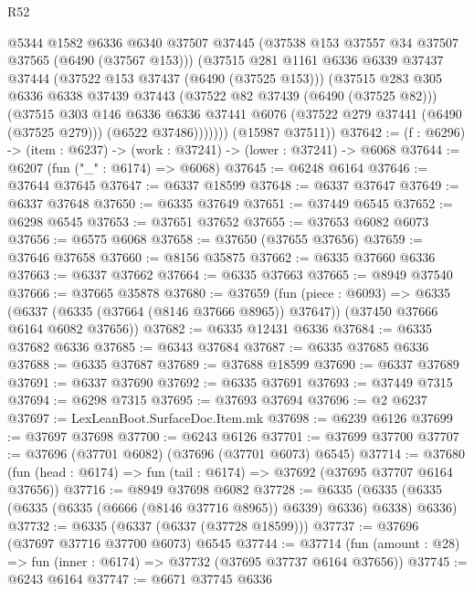 \begin{lexlean}{R52}
\begin{coremodule}
            @5344
            @1582
            @6336
            @6340
            @37507
            @37445
            (@37538 @153 @37557 @34 @37507 @37565 (@6490 (@37567 @153)))
            (@37515
              @281
              @1161
              @6336
              @6339
              @37437
              @37444
              (@37522 @153 @37437 (@6490 (@37525 @153)))
              (@37515
                @283
                @305
                @6336
                @6338
                @37439
                @37443
                (@37522 @82 @37439 (@6490 (@37525 @82)))
                (@37515
                  @303
                  @146
                  @6336
                  @6336
                  @37441
                  @6076
                  (@37522 @279 @37441 (@6490 (@37525 @279)))
                  (@6522 @37486)))))))
      (@15987 @37511))
@37642 := (f : @6296) -> (item : @6237) -> (work : @37241) -> (lower : @37241) -> @6068
@37644 := @6207 (fun ("_" : @6174) => @6068)
@37645 := @6248 @6164
@37646 := @37644 @37645
@37647 := @6337 @18599
@37648 := @6337 @37647
@37649 := @6337 @37648
@37650 := @6335 @37649
@37651 := @37449 @6545
@37652 := @6298 @6545
@37653 := @37651 @37652
@37655 := @37653 @6082 @6073
@37656 := @6575 @6068
@37658 := @37650 (@37655 @37656)
@37659 := @37646 @37658
@37660 := @8156 @35875
@37662 := @6335 @37660 @6336
@37663 := @6337 @37662
@37664 := @6335 @37663
@37665 := @8949 @37540
@37666 := @37665 @35878
@37680 := @37659
    (fun (piece : @6093) =>
    @6335 (@6337 (@6335 (@37664 (@8146 @37666 @8965)) @37647)) (@37450 @37666 @6164 @6082 @37656))
@37682 := @6335 @12431 @6336
@37684 := @6335 @37682 @6336
@37685 := @6343 @37684
@37687 := @6335 @37685 @6336
@37688 := @6335 @37687
@37689 := @37688 @18599
@37690 := @6337 @37689
@37691 := @6337 @37690
@37692 := @6335 @37691
@37693 := @37449 @7315
@37694 := @6298 @7315
@37695 := @37693 @37694
@37696 := @2 @6237
@37697 := LexLeanBoot.SurfaceDoc.Item.mk
@37698 := @6239 @6126
@37699 := @37697 @37698
@37700 := @6243 @6126
@37701 := @37699 @37700
@37707 := @37696 (@37701 @6082) (@37696 (@37701 @6073) @6545)
@37714 := @37680 (fun (head : @6174) => fun (tail : @6174) => @37692 (@37695 @37707 @6164 @37656))
@37716 := @8949 @37698 @6082
@37728 := @6335 (@6335 (@6335 (@6335 (@6335 (@6666 (@8146 @37716 @8965)) @6339) @6336) @6338) @6336)
@37732 := @6335 (@6337 (@6337 (@37728 @18599)))
@37737 := @37696 (@37697 @37716 @37700 @6073) @6545
@37744 := @37714 (fun (amount : @28) => fun (inner : @6174) => @37732 (@37695 @37737 @6164 @37656))
@37745 := @6243 @6164
@37747 := @6671 @37745 @6336

\end{coremodule}
\end{lexlean}
